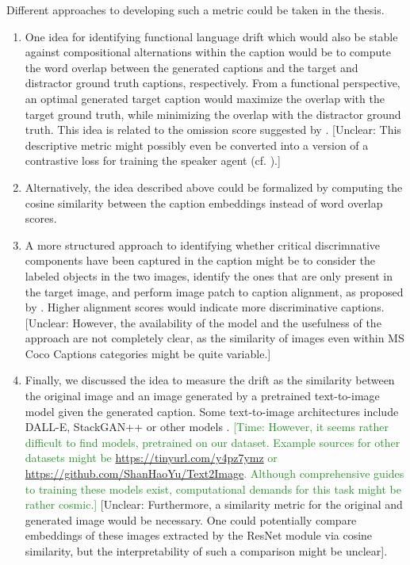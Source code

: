 \documentclass[11pt,letterpaper]{article}
\newcommand{\unclear}[1]{\textcolor{Cerulean}{[Unclear: #1]}}
\newcommand{\timing}[1]{\textcolor{ForestGreen}{[Time: #1]}}
\begin{document}
\begin{enumerate}
Different approaches to developing such a metric could be taken in the thesis. 
\begin{enumerate}
	\item One idea for identifying functional language drift which would also be stable against compositional alternations within the caption would be to compute the word overlap between the generated captions and the target and distractor ground truth captions, respectively. From a functional perspective, an optimal generated target caption would maximize the overlap with the target ground truth, while minimizing the overlap with the distractor ground truth. This idea is related to the omission score suggested by \cite{havrylov2017emergence}. \unclear{This descriptive metric might possibly even be converted into a version of a contrastive loss for training the speaker agent (cf. \cite{andreas2016reasoning, gunel2020supervised}).}
	\item Alternatively, the idea described above could be formalized by computing the cosine similarity between the caption embeddings instead of word overlap scores. 
	\item A more structured approach to identifying whether critical discrimnative components have been captured in the caption might be to consider the labeled objects in the two images, identify the ones that are only present in the target image, and perform image patch to caption alignment, as proposed by \cite{karpathy2015deep}. Higher alignment scores would indicate more discriminative captions. \unclear{However, the availability of the model and the usefulness of the approach are not completely clear, as the similarity of images even within MS Coco Captions categories might be quite variable.}
	\item Finally, we discussed the idea to measure the drift as the similarity between the original image and an image generated by a pretrained text-to-image model given the generated caption. Some text-to-image architectures include DALL-E, StackGAN++ or other models \cite{ramesh2021zero, zhang2018stackgan++, zhou2021lafite}. \timing{However, it seems rather difficult to find models, pretrained on our dataset. Example sources for other datasets might be \url{https://tinyurl.com/y4pz7ymz} or \url{https://github.com/ShanHaoYu/Text2Image}. Although comprehensive guides to training these models exist, computational demands for this task might be rather cosmic.}
	 \unclear{Furthermore, a similarity metric for the original and generated image would be necessary. One could potentially compare embeddings of these images extracted by the ResNet module via cosine similarity, but the interpretability of such a comparison might be unclear}.  

\end{enumerate}
\end{enumerate}
\end{document}
